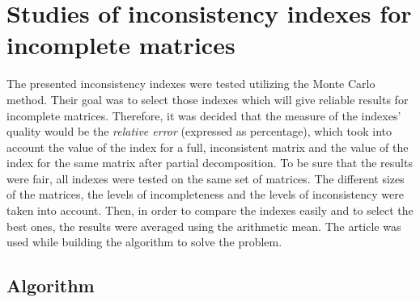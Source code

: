 \chapter{Studies of inconsistency indexes for incomplete matrices}
\label{sec:studiesOfInconsistencyIndexesForIncompleteMatrices}

The presented inconsistency indexes were tested utilizing the Monte Carlo method. Their goal was to select those indexes which will give reliable results for incomplete matrices. Therefore, it was decided that the measure of the indexes' quality would be the \textit{relative error} (expressed as  percentage), which took into account the value of the index for a full, inconsistent matrix and the value of the index for the same matrix after partial decomposition. To be sure that the results were fair, all indexes were tested on the same set of matrices. The different sizes of the matrices, the levels of incompleteness and the levels of inconsistency were taken into account. Then, in order to compare the indexes easily and to select the best ones, the results were averaged using the arithmetic mean. The article \cite{Kazibudzki2017} was used while building the algorithm to solve the problem.


\section{Algorithm}
